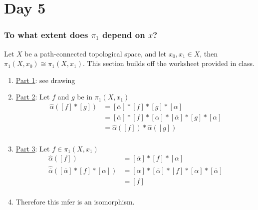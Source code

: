 \documentclass[../notes.tex]{subfiles}
\begin{document}
\section{Day 5}
    \subsubsection{To what extent does $\pi_1$ depend on $x$?}
    \begin{theorem} Let $X$ be a path-connected topological space, and let $x_0,x_1\in X$, then
    $\pi_1(X,x_0)\cong\pi_1(X,x_1)$. This section builds off the worksheet provided in class.
    \begin{enumerate}
        \item \underline{Part 1}: see drawing
        \item \underline{Part 2}: Let $f$ and $g$ be in $\pi_1(X,x_1)$
            \begin{align*}
                \hat{\alpha}([f]*[g])
                &=[\overline{\alpha}] *[f]*[g] *[\alpha]\\
                &=[\overline{\alpha}] *[f] *[\alpha] *[\overline{\alpha}] *[g] *[\alpha]\\
                &=\hat{\alpha}([f])*\hat{\alpha}([g])\\
            \end{align*}
        \item \underline{Part 3}: Let $f \in \pi_1(X,x_1)$
            \begin{align*}
                \hat{\alpha}([f])
                &=[\overline{\alpha}] *[f] *[\alpha]\\
                \hat{\overline{\alpha}}( [\overline{\alpha}] *[f] *[\alpha])
                &=[\alpha] *[\overline{\alpha}] *[f] *[\alpha] *[\overline{\alpha}]\\
                &=[f]\\
            \end{align*}
        \item Therefore this mfer is an isomorphism.
    \end{enumerate}
    \end{theorem}
\end{document}
